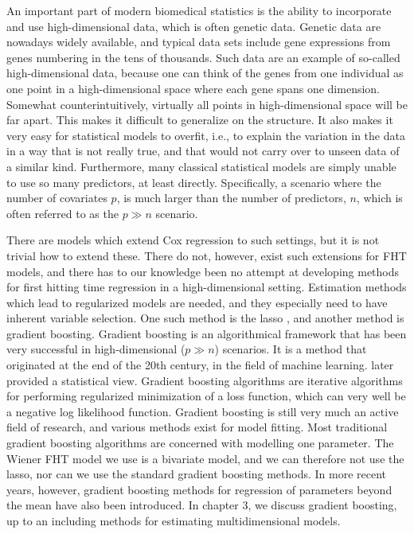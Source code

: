 An important part of modern biomedical statistics is the ability to incorporate and use high-dimensional data, which is often genetic data.
Genetic data are nowadays widely available, and typical data sets include gene expressions from genes numbering in the tens of thousands.
Such data are an example of so-called high-dimensional data, because one can think of the genes from one individual as one point in a high-dimensional space where each gene spans one dimension.
Somewhat counterintuitively, virtually all points in high-dimensional space will be far apart.
This makes it difficult to generalize on the structure.
It also makes it very easy for statistical models to overfit, i.e., to explain the variation in the data in a way that is not really true, and that would not carry over to unseen data of a similar kind.
Furthermore, many classical statistical models are simply unable to use so many predictors, at least directly.
Specifically, a scenario where the number of covariates $p$, is much larger than the number of predictors, $n$, which is often referred to as the $p\gg n$ scenario.

There are models which extend Cox regression to such settings, but it is not trivial how to extend these.
There do not, however, exist such extensions for FHT models, and there has to our knowledge been no attempt at developing methods for first hitting time regression in a high-dimensional setting.
Estimation methods which lead to regularized models are needed, and they especially need to have inherent variable selection.
One such method is the lasso \citep{lasso}, and another method is gradient boosting.
Gradient boosting is an algorithmical framework that has been very successful in high-dimensional ($p\gg n$) scenarios.
It is a method that originated at the end of the 20th century, in the field of machine learning.
\citet{friedman2001} later provided a statistical view.
Gradient boosting algorithms are iterative algorithms for performing regularized minimization of a loss function, which can very well be a negative log likelihood function.
Gradient boosting is still very much an active field of research, and various methods exist for model fitting.
Most traditional gradient boosting algorithms are concerned with modelling one parameter.
The Wiener FHT model we use is a bivariate model, and we can therefore not use the lasso, nor can we use the standard gradient boosting methods.
In more recent years, however, gradient boosting methods for regression of parameters beyond the mean have also been introduced.
In chapter 3, we discuss gradient boosting, up to an including methods for estimating multidimensional models.


